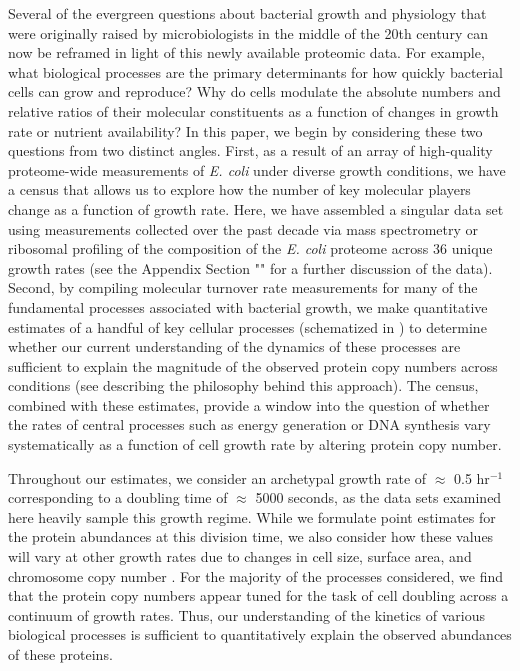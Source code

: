 Several of the evergreen questions about bacterial growth and physiology that
were originally raised by microbiologists in the middle of the 20th century
can now be reframed in light of this newly available proteomic data. For example, what
biological processes are the primary determinants for how quickly bacterial
cells can grow and reproduce? Why do cells modulate the absolute numbers and
relative ratios of their molecular constituents as a function of changes in
growth rate or nutrient availability? In this paper, we begin by considering
these two questions from two distinct angles. First, as a result of an array
of high-quality proteome-wide measurements of \textit{E. coli} under diverse
growth conditions, we have a census that allows us to explore how the number
of key molecular players change as a function of growth rate. Here, we have
assembled a singular data set using measurements collected over the past
decade via mass spectrometry \citep{schmidt2016, peebo2015, valgepea2013} or
ribosomal profiling \citep{li2014} of the composition of the \textit{E. coli}
proteome across 36 unique growth rates (see the Appendix Section
"" for a further discussion of the data). Second,
by compiling molecular turnover rate measurements for many of the fundamental
processes associated with bacterial growth, we make quantitative estimates of
a handful of key cellular processes (schematized in ) to determine whether
our current understanding of the dynamics of these processes are sufficient
to explain the magnitude of the observed protein copy numbers across
conditions (see  describing the philosophy behind this
approach). The census, combined with these estimates, provide a window into
the question of whether the rates of central processes such as energy
generation or DNA synthesis vary systematically as a function of
cell growth rate by altering protein copy number.

Throughout our estimates, we consider an archetypal growth rate of $\approx$ 0.5
hr$^{-1}$ corresponding to a doubling time of $\approx$ 5000 seconds, as the
data sets examined here heavily sample this growth regime. While we formulate
point estimates for the protein abundances at this division time, we also
consider how these values will vary at other growth rates due to changes in cell
size, surface area, and chromosome copy number \citep{taheriaraghi2015,
harris2018}. For the majority of the processes considered, we find that the
protein copy numbers appear tuned for the task of cell doubling across a
continuum of growth rates. Thus, our understanding of the kinetics of various
biological processes is sufficient to quantitatively explain the observed
abundances of these proteins.

